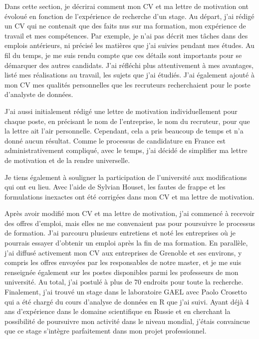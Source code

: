 \documentclass[12pt]{article}
\begin{document}
Dans cette section, je décrirai comment mon CV et ma lettre de
motivation ont évoloué en fonction de l'expérience de recherche d'un
stage. Au départ, j'ai rédigé un CV qui ne contenait que des faits nus
sur ma formation, mon expérience de travail et mes compétences. Par
exemple, je n'ai pas décrit mes tâches dans des emplois antérieurs, ni
précisé les matières que j'ai suivies pendant mes études. Au fil du
temps, je me suis rendu compte que ces détails sont importants pour se
démarquer des autres candidats. J'ai réfléchi plus attentivement à mes
avantages, listé mes réalisations au travail, les sujets que j'ai
étudiés. J'ai également ajouté à mon CV mes qualités personnelles que
les recruteurs recherchaient pour le poste d'analyste de données.

J'ai aussi initialement rédigé une lettre de motivation individuellement
pour chaque poste, en précisant le nom de l'entreprise, le nom du
recruteur, pour que la lettre ait l'air personnelle. Cependant, cela a
pris beaucoup de temps et n'a donné aucun résultat. Comme le processus
de candidature en France est administrativement compliqué, avec le
temps, j'ai décidé de simplifier ma lettre de motivation et de la rendre
universelle.

Je tiens également à souligner la participation de l'université aux
modifications qui ont eu lieu. Avec l'aide de Sylvian Houset, les fautes
de frappe et les formulations inexactes ont été corrigées dans mon CV et
ma lettre de motivation.

Après avoir modifié mon CV et ma lettre de motivation, j'ai commencé à
recevoir des offres d'emploi, mais elles ne me convenaient pas pour
poursuivre le processus de formation. J'ai parcouru plusieurs entretiens
et noté les entreprises où je pourrais essayer d'obtenir un emploi après
la fin de ma formation. En parallèle, j'ai diffusé activement mon CV aux
entreprises de Grenoble et ses environs, y compris les offres envoyées
par les responsables de notre master, et je me suis renseignée également
sur les postes disponibles parmi les professeurs de mon université. Au
total, j'ai postulé à plus de 70 endroits pour toute la recherche.
Finalement, j'ai trouvé un stage dans le laboratoire GAEL avec Paolo
Crosetto qui a été chargé du cours d'analyse de données en R que j'ai
suivi. Ayant déjà 4 ans d'expérience dans le domaine scientifique en
Russie et en cherchant la possibilité de poursuivre mon activité dans le
niveau mondial, j'étais convaincue que ce stage s'intègre parfaitement
dans mon projet professionnel.
\end{document}
